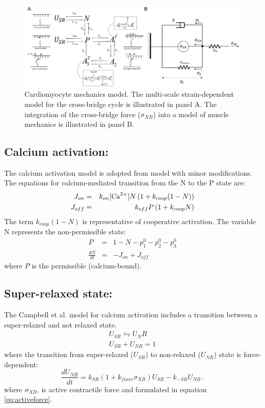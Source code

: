 \documentclass[fleqn,10pt]{physiome}
\begin{document}
\begin{figure}[hb]\centering
\includegraphics[width=1.0\linewidth]{FigS1.jpg}
\caption{Cardiomyocyte mechanics model. The multi-scale strain-dependent model for the cross-bridge cycle is illustrated in panel A. The integration of the cross-bridge force ($\sigma_{XB}$) into a model of muscle mechanics is illustrated in panel B.}
\label{fig:crossbridge}
\end{figure}

\subsection{Calcium activation:}
The calcium activation model is adopted from \cite{Campbell2018} model with minor modifications. The equations for calcium-mediated transition from the N to the P state are: 
\begin{eqnarray}
  J_{on}    &=& k_{on}  [{\rm Ca}^{2+} ]  N \left(1 + k_{coop} (1-N) \right) \nonumber \\ 
  J_{off} &=& k_{off}  P \left( 1 + k_{coop}  N \right)
\end{eqnarray}
The term $k_{coop} (1-N)$ is representative of cooperative activation.
The variable N represents the non-permissible state: 
\begin{eqnarray}
  P             &=& 1 - N - p_1^0 - p_2^0 - p_3^0 \nonumber \\
  \frac{dN}{dt} &=& -J_{on} + J_{off} 
\end{eqnarray}
where $P$ is the permissible (calcium-bound).

\subsection{Super-relaxed state:}
The Campbell et al. model for calcium activation includes a transition between a super-relaxed and not relaxed state.
\begin{eqnarray}
 U_{SR} \leftrightharpoons U_NR \nonumber \\
 U_{SR} + U_{NR} = 1
\end{eqnarray}
where the transition from super-relaxed ($U_{SR}$) to non-relaxed ($U_{NR}$) state is force-dependent:
\begin{equation}
  \frac{dU_{NR}}{dt} = k_{SR} \left( 1 + k_{force}  \sigma_{XB} \right)U_{SR} - k_{-SR}  U_{NR} \, .
\end{equation}
where $\sigma_{XB}$, is active contractile force and formulated in equation ~ \ref{eq:activeforce}. 
\end{document}
